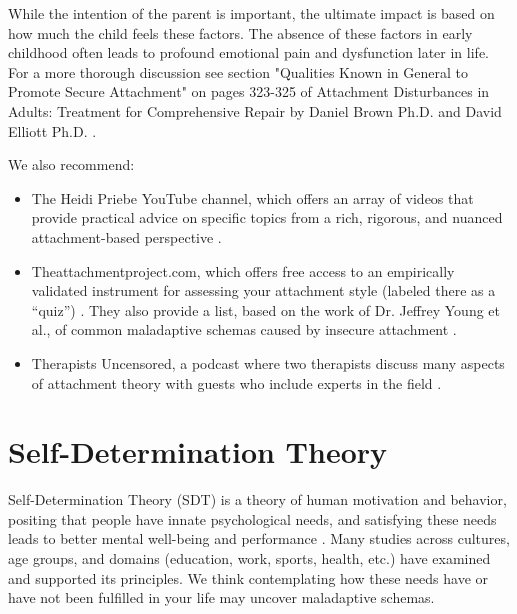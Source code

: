 \documentclass[12pt,letterpaper]{book}
\begin{document}
While the intention of the parent is important, the ultimate impact is based on how much the child feels these factors. The absence of these factors in early childhood often leads to profound emotional pain and dysfunction later in life. For a more thorough discussion see section "Qualities Known in General to Promote Secure Attachment" on pages 323-325 of Attachment Disturbances in Adults: Treatment for Comprehensive Repair by Daniel Brown Ph.D. and David Elliott Ph.D. \cite{brownAttachmentDisturbances}.

We also recommend:
\begin{itemize}
    \item The Heidi Priebe YouTube channel, which offers an array of videos that provide practical advice on specific topics from a rich, rigorous, and nuanced attachment-based perspective \cite{priebeYoutube}.
    \item Theattachmentproject.com, which offers free access to an empirically validated instrument for assessing your attachment style (labeled there as a “quiz”) \cite{attachmentProject}. They also provide a list, based on the work of Dr. Jeffrey Young et al., of common maladaptive schemas caused by insecure attachment \cite{earlyMalSchemas}.
    \item Therapists Uncensored, a podcast where two therapists discuss many aspects of attachment theory with guests who include experts in the field \cite{therapistsUncensored}.
\end{itemize}
\chapter{Self-Determination Theory}
\label{sec:sdt}
Self-Determination Theory (SDT) is a theory of human motivation and behavior, positing that people have innate psychological needs, and satisfying these needs leads to better mental well-being and performance \cite{deciSDT}. Many studies across cultures, age groups, and domains (education, work, sports, health, etc.) have examined and supported its principles. We think contemplating how these needs have or have not been fulfilled in your life may uncover maladaptive schemas.
\end{document}

